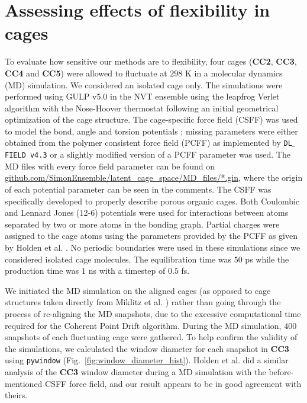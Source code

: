 \documentclass[journal=jacsat,manuscript=article]{achemso}
\begin{document}
\newpage
\clearpage

\section{\color{red}Assessing effects of flexibility in cages} 
\label{sec:flexibility}

{\color{red}To evaluate how sensitive our methods are to flexibility, four cages (\textbf{CC2}, \textbf{CC3}, \textbf{CC4} and \textbf{CC5}) were allowed to fluctuate at $298$ K in a molecular dynamics (MD) simulation. We considered an isolated cage only. The simulations were performed using GULP v5.0 \cite{gale1997gulp} in the NVT ensemble using the leapfrog Verlet algorithm with the Nose-Hoover thermostat following an initial geometrical optimization of the cage structure. The cage-specific force field (CSFF) was used to model the bond, angle and torsion potentials \cite{holden2012bespoke}; missing parameters were either obtained from the polymer consistent force field (PCFF) \cite{sun1994ab,sun1994force,sun1995ab} as implemented by \texttt{DL$\_$FIELD v4.3} \cite{yong2016dlfield} or a slightly modified version of a PCFF parameter was used. The MD files with every force field parameter can be found on \url{github.com/SimonEnsemble/latent_cage_space/MD_files/*.gin}, where the origin of each potential parameter can be seen in the comments. The CSFF was specifically developed to properly describe porous organic cages. Both Coulombic and Lennard Jones (12-6) potentials were used for interactions between atoms separated by two or more atoms in the bonding graph. Partial charges were assigned to the cage atoms using the parameters provided by the PCFF as given by Holden et al. \cite{holden2012bespoke}. No periodic boundaries were used in these simulations since we considered isolated cage molecules. The equilibration time was $50$ ps while the production time was $1$ ns with a timestep of $0.5$ fs.

We initiated the MD simulation on the aligned cages (as opposed to cage structures taken directly from Miklitz et al. \cite{miklitz2017computational}) rather than going through the process of re-aligning the MD snapshots, due to the excessive computational time required for the Coherent Point Drift algorithm. During the MD simulation, $400$ snapshots of each fluctuating cage were gathered. To help confirm the validity of the simulations, we calculated the window diameter for each snapshot in \textbf{CC3} using \texttt{pywindow} (Fig.~\ref{fig:window_diameter_hist}). Holden et al.\cite{holden2012bespoke} did a similar analysis of the \textbf{CC3} window diameter during a MD simulation with the before-mentioned CSFF force field, and our result appears to be in good agreement with theirs.

}
\end{document}

